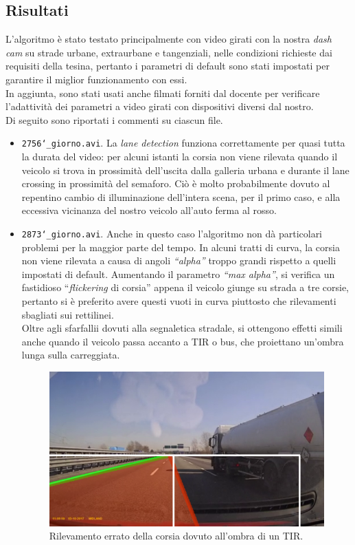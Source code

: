 \documentclass[12pt]{article}
\begin{document}
\subsection{Risultati}
\hspace{0.2 cm} L'algoritmo è stato testato principalmente con video girati con la nostra \textit{dash cam} su strade urbane, extraurbane e tangenziali, nelle condizioni richieste dai requisiti della tesina, pertanto i parametri di default sono stati impostati per garantire il miglior funzionamento con essi.\\
In aggiunta, sono stati usati anche filmati forniti dal docente per verificare l'adattività dei parametri a video girati con dispositivi diversi dal nostro.\\
Di seguito sono riportati i commenti su ciascun file.
\begin{itemize}
\item \texttt{2756\char`_giorno.avi}. La \textit{lane detection} funziona correttamente per quasi tutta la durata del video: per alcuni istanti la corsia non viene rilevata quando il veicolo si trova in prossimità dell'uscita dalla galleria urbana e durante il lane crossing in prossimità del semaforo. Ciò è molto probabilmente dovuto al repentino cambio di illuminazione dell'intera scena, per il primo caso, e alla eccessiva vicinanza del nostro veicolo all'auto ferma al rosso.
\item \texttt{2873\char`_giorno.avi}. Anche in questo caso l'algoritmo non dà particolari problemi per la maggior parte del tempo. In alcuni tratti di curva, la corsia non viene rilevata a causa di angoli \textit{``alpha''} troppo grandi rispetto a quelli impostati di default. Aumentando il parametro \textit{``max alpha''}, si verifica un fastidioso ``\textit{flickering} di corsia'' appena il veicolo giunge su strada a tre corsie, pertanto si è preferito avere questi vuoti in curva piuttosto che rilevamenti sbagliati sui rettilinei.\\
Oltre agli sfarfallii dovuti alla segnaletica stradale, si ottengono effetti simili anche quando il veicolo passa accanto a TIR o bus, che proiettano un'ombra lunga sulla carreggiata.
\begin{figure}[htbp]
\centering
\includegraphics[scale=0.5]{tir.png}
\caption{Rilevamento errato della corsia dovuto all'ombra di un TIR.}
\end{figure}


\end{itemize}
\end{document}
